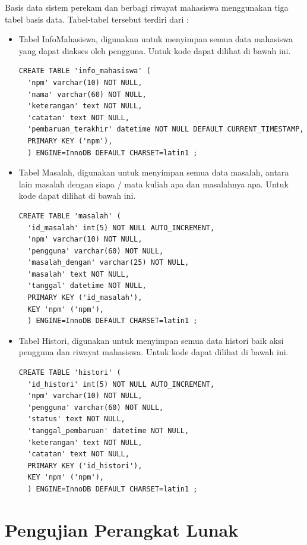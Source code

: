 Basis data sistem perekam dan berbagi riwayat mahasiswa menggunakan tiga tabel basis data. Tabel-tabel tersebut terdiri dari :
\begin{itemize}
\item Tabel InfoMahasiswa, digunakan untuk menyimpan semua data mahasiswa yang dapat diakses oleh pengguna. Untuk kode dapat dilihat di bawah ini.

\begin{lstlisting}[basicstyle=\footnotesize]
  CREATE TABLE 'info_mahasiswa' (
  'npm' varchar(10) NOT NULL,
  'nama' varchar(60) NOT NULL,
  'keterangan' text NOT NULL,
  'catatan' text NOT NULL,
  'pembaruan_terakhir' datetime NOT NULL DEFAULT CURRENT_TIMESTAMP,
  PRIMARY KEY ('npm'),
  ) ENGINE=InnoDB DEFAULT CHARSET=latin1 ;
\end{lstlisting}

\item Tabel Masalah, digunakan untuk menyimpan semua data masalah, antara lain masalah dengan siapa / mata kuliah apa dan masalahnya apa. Untuk kode dapat dilihat di bawah ini.

\begin{lstlisting}[basicstyle=\footnotesize]
  CREATE TABLE 'masalah' (
  'id_masalah' int(5) NOT NULL AUTO_INCREMENT,
  'npm' varchar(10) NOT NULL,
  'pengguna' varchar(60) NOT NULL,
  'masalah_dengan' varchar(25) NOT NULL,
  'masalah' text NOT NULL,
  'tanggal' datetime NOT NULL,
  PRIMARY KEY ('id_masalah'),
  KEY 'npm' ('npm'),
  ) ENGINE=InnoDB DEFAULT CHARSET=latin1 ;
\end{lstlisting}

\item Tabel Histori, digunakan untuk menyimpan semua data histori baik aksi pengguna dan riwayat mahasiswa. Untuk kode dapat dilihat di bawah ini.

\begin{lstlisting}[basicstyle=\footnotesize]
  CREATE TABLE 'histori' (
  'id_histori' int(5) NOT NULL AUTO_INCREMENT,
  'npm' varchar(10) NOT NULL,
  'pengguna' varchar(60) NOT NULL,
  'status' text NOT NULL,
  'tanggal_pembaruan' datetime NOT NULL,
  'keterangan' text NOT NULL,
  'catatan' text NOT NULL,
  PRIMARY KEY ('id_histori'),
  KEY 'npm' ('npm'),
  ) ENGINE=InnoDB DEFAULT CHARSET=latin1 ;
\end{lstlisting}
\end{itemize}

\section{Pengujian Perangkat Lunak}
\label{sec:pengujianperangkatlunak}

